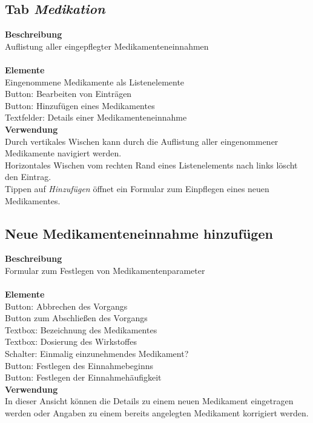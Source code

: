 \documentclass[a4paper]{scrreprt}
\begin{document}
\begin{minipage}[t][][b]{0.65\textwidth}
\subsection*{Tab \textit{Medikation}}
\textbf{Beschreibung}\\
{Auflistung aller eingepflegter \gls{Medikament}eneinnahmen}\\
~\\
\textbf{Elemente}\\
{Eingenommene \gls{Medikament}e als Listenelemente}\\
{Button: Bearbeiten von Einträgen}\\
{Button: Hinzufügen eines \gls{Medikament}es}\\
{Textfelder: Details einer \gls{Medikament}eneinnahme}\\

\textbf{Verwendung}\\
{Durch vertikales Wischen kann durch die Auflistung aller eingenommener \gls{Medikament}e navigiert werden.}\\
{Horizontales Wischen vom rechten Rand eines Listenelements nach links löscht den Eintrag.}\\
{Tippen auf \textit{Hinzufügen} öffnet ein Formular zum Einpflegen eines neuen \gls{Medikament}es.}

\subsection*{Neue \gls{Medikament}eneinnahme hinzufügen}
\textbf{Beschreibung}\\
{Formular zum Festlegen von \gls{Medikament}enparameter}\\
~\\
\textbf{Elemente}\\
{Button: Abbrechen des Vorgangs}\\
{Button zum Abschließen des Vorgangs}\\
{Textbox: Bezeichnung des \gls{Medikament}es}\\
{Textbox: Dosierung des Wirkstoffes}\\
{Schalter: Einmalig einzunehmendes \gls{Medikament}?}\\
{Button: Festlegen des Einnahmebeginns}\\
{Button: Festlegen der Einnahmehäufigkeit}\\

\textbf{Verwendung}\\
{In dieser Ansicht können die Details zu einem neuen \gls{Medikament} eingetragen werden oder Angaben zu einem bereits angelegten \gls{Medikament} korrigiert werden.}
\end{minipage}%
\end{document}
